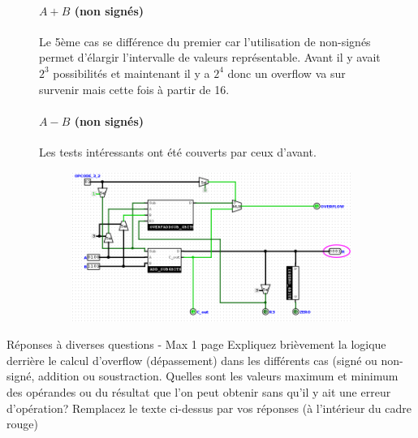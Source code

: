 \documentclass[a4paper]{article}
\begin{document}
\begin{tcolorbox}[colframe=Monokaimagenta,colback=white]
\begin{figure}[H]
\paragraph{$A+B$ (non signés)}
Le 5ème cas se différence du premier car l'utilisation de non-signés permet d'élargir l'intervalle de valeurs représentable. Avant il y avait $2^3$ possibilités et maintenant il y a $2^4$ donc un overflow va sur survenir mais cette fois à partir de 16.\\


\paragraph{$A-B$ (non signés)}
Les tests intéressants ont été couverts par ceux d'avant. \\

\begin{figure}[H]
    \centering
    \includegraphics[width=\textwidth]{src/ADDSUB_TEST_AmoNsB.png}
    \label{fig:ex_non_signes}
\end{figure}

\end{figure}


\end{tcolorbox}

\begin{tcolorbox}[colframe=Monokaimagenta,colback=white]
Réponses à diverses questions - Max 1 page
Expliquez brièvement la logique derrière le calcul d’overflow (dépassement) dans les différents cas (signé ou non-signé, addition ou soustraction.
Quelles sont les valeurs maximum et minimum des opérandes ou du résultat que l’on peut obtenir sans qu’il y ait une erreur d’opération?
Remplacez le texte ci-dessus par vos réponses (à l’intérieur du cadre rouge)
\end{tcolorbox}
\end{document}

